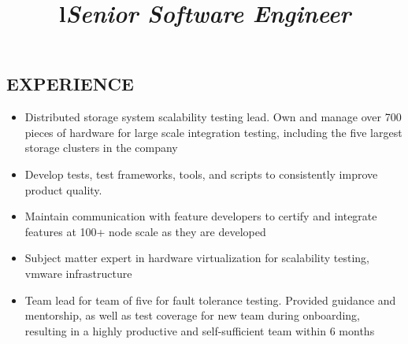 \documentclass[line, margin]{res}
\title{l}\dates{r}\\
\begin{document}
\address{500 Elliott Ave W Apt 308, Seattle, WA 98119}
\address{253-508-2725}

 
\begin{resume}

 
 
\section{EXPERIENCE} 
   \title{\it Senior Software Engineer}
   \begin{position}
                 \begin{itemize}  \itemsep -2pt %
                \item Distributed storage system scalability testing lead. 
                   Own and manage over 700 pieces of hardware for large scale 
                       integration testing, including the five largest
                       storage clusters in the company

                \item Develop tests, test frameworks, tools, and scripts to
                   consistently improve product quality. 

                \item Maintain communication with feature developers to certify
                   and integrate features at 100+ node scale as they are developed

                \item Subject matter expert in hardware virtualization
                   for scalability testing, vmware infrastructure

                \item Team lead for team of five for fault tolerance testing.
                   Provided guidance and mentorship, as well as test coverage
                       for new team during onboarding, resulting in a highly productive
                       and self-sufficient team within 6 months


\end{itemize}
\end{position}
\end{resume}
\end{document}
